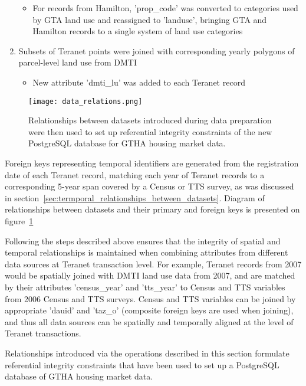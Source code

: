 \begin{enumerate}
\begin{itemize}
        \item For records from Hamilton, 'prop\_code' was converted to categories used by GTA land use and reassigned to 'landuse', bringing GTA and Hamilton records to a single system of land use categories
    \end{itemize}
    \item Subsets of Teranet points were joined with corresponding yearly polygons of parcel-level land use from DMTI
    \begin{itemize}
        \item New attribute 'dmti\_lu' was added to each Teranet record
    \end{itemize}
\end{enumerate}

\begin{figure}[hbt!]
    \centering
    \texttt{[image: data\_relations.png]}
    \caption{Relationships between datasets introduced during data preparation were then used to set up referential integrity constraints of the new PostgreSQL database for GTHA housing market data.}
    \label{fig:data_relations}
\end{figure}

Foreign keys representing temporal identifiers are generated from the registration date of each Teranet record, matching each year of Teranet records to a corresponding 5-year span covered by a Census or TTS survey, as was discussed in section~\ref{sec:termporal_relationships_between_datasets}.
Diagram of relationships between datasets and their primary and foreign keys is presented on figure~\ref{fig:data_relations}

Following the steps described above ensures that the integrity of spatial and temporal relationships is maintained when combining attributes from different data sources at Teranet transaction level.
For example, Teranet records from 2007 would be spatially joined with DMTI land use data from 2007, and are matched by their attributes 'census\_year' and 'tts\_year' to Census and TTS variables from 2006 Census and TTS surveys.
Census and TTS variables can be joined by appropriate 'dauid' and 'taz\_o' (composite foreign keys are used when joining), and thus all data sources can be spatially and temporally aligned at the level of Teranet transactions.

Relationships introduced via the operations described in this section formulate referential integrity constraints that have been used to set up a PostgreSQL database of GTHA housing market data.

